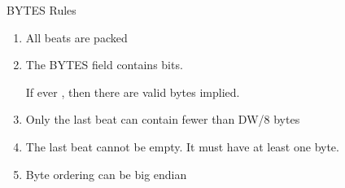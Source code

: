 \documentclass[style=gt,mode=present,paper=screen]{powerdot}
\begin{document}
\begin{slide}[method=file]{BYTES Rules}
\begin{enumerate}
\item All beats are packed
\item The BYTES field contains  bits.

	If ever , then there are
	 valid bytes implied.

\item Only the last beat can contain fewer than DW/8 bytes
\item The last beat cannot be empty.  It must have at least one byte.
\item Byte ordering can be big  endian
\end{enumerate}

\begin{center}
%
\end{center}
\end{slide}
%
%
%
%
\end{document}

